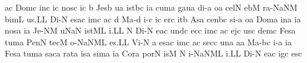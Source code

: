 a{}\punctum c\egn
\spatium
\sgn Dom\punctum c\egn
\sgn {}in\punctum c\egn
\sgn {}i{}\punctum c\egn
\spatium
\sgn nos\punctum c\egn
{}i{}\punctum c\egn
\spatium
\custos b
\lineaproxima
\sgn Jes\punctum b\egn
\sgn {}u{}\punctum a\egn
\spatium
{}i{st}\pes bc\egn
\sgn {}i{}\punctum a\egn
\spatium
\sgn cum\punctum a\egn
\spatium
\sgn gau\punctum a\egn
\sgn di-\punctum a\egn
\sgn {}o{}\punctum a\egn
\spatium
\sgn cel\punctum N\egn
\sgn {}eb\punctum M\egn
\sgn ra-\pessubbipunctis NaNM\egn
\sgn bim\punctum L\egn
\sgn {}u{s.}\punctum L\augmentum L\egn
\spatium
\divisiofinalis
\spatium
\spatium
\sgn Di-\punctum N\egn
\sgn {}es\pes ac\egn
\spatium
{}im\punctum c\egn
\sgn {}a{}\punctum c\egn
\spatium
\custos d\lineaproxima
\sgn Ma-\punctum d\egn
\sgn {}i{-}\punctum c\egn
\sgn {}i{}\punctum c\egn
\spatium
\sgn {}er\punctum c\egn
\sgn {}it\punctum b\egn
\spatium
\sgn {}As\punctum a\egn
\sgn cen\pes bc\egn
\sgn si-\punctum a\egn
\sgn {}o{}\punctum a\egn
\spatium
\sgn Dom\punctum a\egn
\sgn {}in\punctum a\egn
\sgn {}i{}\punctum a\egn
\spatium
\sgn nos\punctum a\egn
{}i{}\punctum a\egn
\spatium
\sgn Je-\clivis NM\egn
{}u{}\torculus NaN\egn
\spatium
{}i{st}\clivis ML\egn
\sgn {}i.\punctum L\augmentum L\egn
\spatium
\divisiofinalis
\spatium
\custos N
\lineaproxima
\sgn Di-\punctum N\egn
\sgn {}e{}\pes ac\egn
\spatium
\sgn {}u{nd}\punctum c\egn
\sgn {}ec\punctum c\egn
\sgn {}im\punctum c\egn
\sgn {}a{}\punctum c\egn
\spatium
\sgn {}ej\punctum c\egn
\sgn {}us\punctum c\egn
\sgn dem\punctum c\egn
\spatium
\sgn Fes\punctum a\egn
\sgn tum\punctum a\egn
\spatium
\sgn Pen\punctum N\egn
\sgn tec\punctum M\egn
\sgn {}o-\pessubbipunctis NaNM\nonspatium\punctuminclinatum L\egn
{}e{s.}\punctum L\augmentum L\egn
\spatium
\divisiofinalis
\spatium
\sgn Vi-\punctum N\egn
\custos a\lineaproxima
{}es\pes ac\egn
\sgn {}im\punctum c\egn
\sgn {}a{}\punctum c\egn
\spatium
\sgn sec\punctum c\egn
\sgn {}un\punctum a\egn
{}a{}\punctum a\egn
\spatium
\sgn Ma-\pes bc\egn
\sgn {}i-\punctum a\egn
\sgn {}i{}\punctum a\egn
\spatium
\sgn Fes\punctum a\egn
\sgn tum\punctum a\egn
\spatium
\sgn sac\punctum a\egn
\sgn rat\punctum a\egn
\sgn {}is\punctum a\egn
\sgn sim\punctum a\egn
\sgn {}i{}\punctum a\egn
\spatium
\sgn Cor\punctum a\egn
\sgn por\punctum N\egn
\sgn {}is\punctum M\egn
\spatium
\custos N\lineaproxima
{}i-\pessubbipunctis NaNM\nonspatium\punctuminclinatum L\egn
{}i.\punctum L\augmentum L\egn
\spatium
\divisiofinalis
\spatium
\sgn Di-\punctum N\egn
\sgn {}e{}\pes ac\egn
\spatium
{}ig\punctum c\egn
\sgn {}es\punctum c\egn
